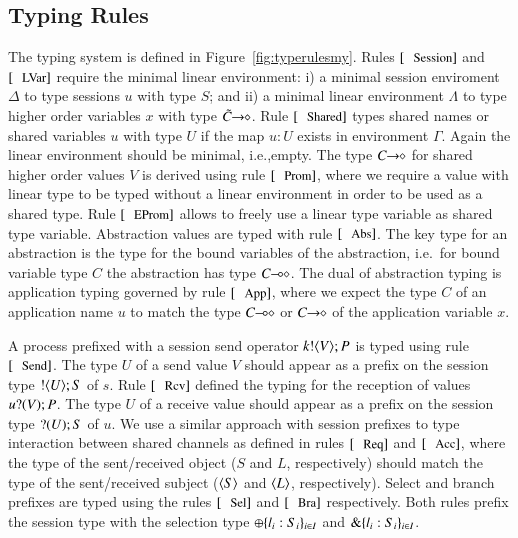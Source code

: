 

\subsection{Typing Rules}



The typing system is defined in Figure~\ref{fig:typerulesmy}.
Rules $\trule{Session}$ and $\trule{LVar}$ require
the minimal linear environment: i) a minimal session enviroment
$\Delta$ to type sessions $u$ with type $S$; and ii)
a minimal linear environment $\Lambda$ to type 
higher order variables $x$ with type $\tilde{C}\!\! \rightarrow\!\! \diamond$.
Rule $\trule{Shared}$
types shared names or shared variables $u$ with
type $U$ if the map $u:U$ exists in environment
$\Gamma$. Again the linear environment should
be minimal, i.e.,empty.
The type $C\!\! \rightarrow\!\! \diamond$ for shared higher order values $V$
is derived using rule $\trule{Prom}$, where we require
a value with linear type to be typed without a linear
environment in order to be used as a shared type.
Rule $\trule{EProm}$ allows to freely use a linear
type variable as shared type variable. 
Abstraction values are typed with rule $\trule{Abs}$.
The key type for an abstraction is the type for
the bound variables of the abstraction, i.e.~for
bound variable type $C$ the abstraction
has type $C\!\! \multimap\!\! \diamond$.
The dual of abstraction typing is application typing
governed by rule $\trule{App}$, where we expect
the type $C$ of an application name $u$ 
to match the type $C\!\! \multimap\!\! \diamond$ or $C\!\! \rightarrow\!\! \diamond$
of the application variable $x$.

A process prefixed with a session send operator $k ! \langle V \rangle ; P$
is typed using rule $\trule{Send}$.
The type $U$ of a send value $V$ should appear as a prefix
on the session type $! \langle U \rangle ; S$ of $s$.
Rule $\trule{Rcv}$
defined the typing for the 
reception of values $u ? (V) ; P$.
The type $U$ of a receive value should 
appear as a prefix on the session type $? (U) ; S$ of $u$.
We use a similar approach with session prefixes
to type interaction between shared channels as defined 
in rules $\trule{Req}$ and $\trule{Acc}$,
where the type of the sent/received object 
($S$ and $L$, respectively) should
match the type of the sent/received subject
($\langle S \rangle$ and $\langle L \rangle$, respectively).
Select and branch prefixes are typed using the rules
$\trule{Sel}$ and $\trule{Bra}$ respectively. Both
rules prefix the session type with the selection
type $\oplus \{l_i: S_i\}_{i \in I}$ and
$\& \{l_i:S_i\}_{i \in I}$.

